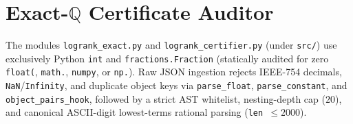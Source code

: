 \documentclass[10pt,twocolumn]{article}
\newcommand{\QQ}{\mathbb{Q}}
\begin{document}
\section{Exact-\texorpdfstring{$\QQ$}{Q} Certificate Auditor}\label{sec:certifier}
The modules \nolinkurl{logrank_exact.py} and \nolinkurl{logrank_certifier.py} (under \texttt{src/}) use exclusively Python \texttt{int} and \texttt{fractions.Fraction} (statically audited for zero \texttt{float(}, \texttt{math.}, \texttt{numpy}, or \texttt{np.}). Raw JSON ingestion rejects IEEE-754 decimals, \texttt{NaN}/\texttt{Infinity}, and duplicate object keys via \nolinkurl{parse_float}, \nolinkurl{parse_constant}, and \nolinkurl{object_pairs_hook}, followed by a strict AST whitelist, nesting-depth cap ($20$), and canonical ASCII-digit lowest-terms rational parsing (\texttt{len $\le 2000$}).
\end{document}
